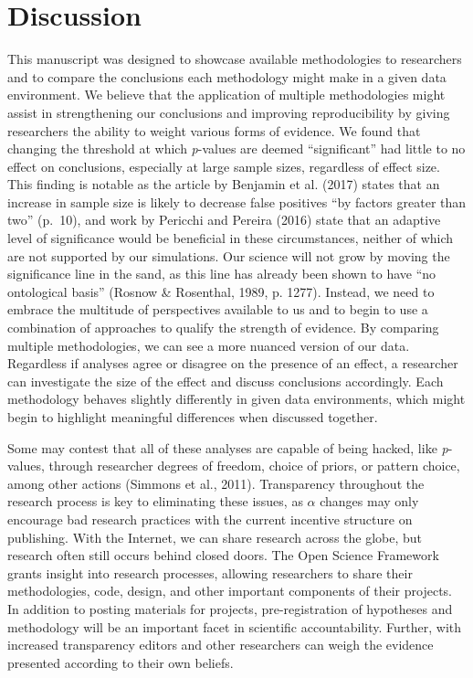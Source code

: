 \documentclass[english,man]{apa6}
\theoremstyle{definition}
\theoremstyle{definition}
\theoremstyle{definition}
\theoremstyle{remark}
\begin{document}
\section{Discussion}\label{discussion}

This manuscript was designed to showcase available methodologies to
researchers and to compare the conclusions each methodology might make
in a given data environment. We believe that the application of multiple
methodologies might assist in strengthening our conclusions and
improving reproducibility by giving researchers the ability to weight
various forms of evidence. We found that changing the threshold at which
\emph{p}-values are deemed \enquote{significant} had little to no effect
on conclusions, especially at large sample sizes, regardless of effect
size. This finding is notable as the article by Benjamin et al. (2017)
states that an increase in sample size is likely to decrease false
positives \enquote{by factors greater than two} (p.~10), and work by
Pericchi and Pereira (2016) state that an adaptive level of significance
would be beneficial in these circumstances, neither of which are not
supported by our simulations. Our science will not grow by moving the
significance line in the sand, as this line has already been shown to
have \enquote{no ontological basis} (Rosnow \& Rosenthal, 1989, p.
1277). Instead, we need to embrace the multitude of perspectives
available to us and to begin to use a combination of approaches to
qualify the strength of evidence. By comparing multiple methodologies,
we can see a more nuanced version of our data. Regardless if analyses
agree or disagree on the presence of an effect, a researcher can
investigate the size of the effect and discuss conclusions accordingly.
Each methodology behaves slightly differently in given data
environments, which might begin to highlight meaningful differences when
discussed together.

Some may contest that all of these analyses are capable of being hacked,
like \emph{p}-values, through researcher degrees of freedom, choice of
priors, or pattern choice, among other actions (Simmons et al., 2011).
Transparency throughout the research process is key to eliminating these
issues, as \(\alpha\) changes may only encourage bad research practices
with the current incentive structure on publishing. With the Internet,
we can share research across the globe, but research often still occurs
behind closed doors. The Open Science Framework grants insight into
research processes, allowing researchers to share their methodologies,
code, design, and other important components of their projects. In
addition to posting materials for projects, pre-registration of
hypotheses and methodology will be an important facet in scientific
accountability. Further, with increased transparency editors and other
researchers can weigh the evidence presented according to their own
beliefs.
\end{document}
